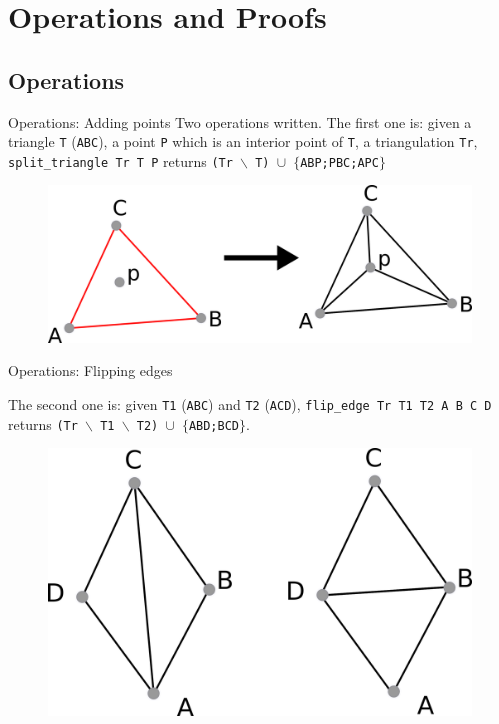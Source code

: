 \documentclass[18pt]{beamer}
\begin{document}
\section{Operations and Proofs}
\subsection{Operations}
\begin{frame}{Operations: Adding points}
Two operations written. The first one is: given a triangle {\tt T} ({\tt ABC}), a point {\tt P} which is an interior point of {\tt T}, a triangulation {\tt Tr}, {\tt split\_triangle Tr T P}
returns {\tt (Tr $\smallsetminus$ T) $\cup$ $\{$ABP;PBC;APC$\}$}

\begin{figure} 
  \centering
  \includegraphics[scale=1.2]{split_triangle}
\end{figure}
  \end{frame}
 

  \begin{frame}{Operations: Flipping edges}
  
   The second one is: given {\tt T1} ({\tt ABC}) and {\tt T2} ({\tt ACD}), {\tt flip\_edge Tr T1 T2 A B C D} returns {\tt (Tr $\smallsetminus$ T1 $\smallsetminus$ T2) $\cup$ $\{$ABD;BCD$\}$}.
   

 \begin{figure}
  \centering
  \includegraphics[scale=0.8]{flip_edge}

\end{figure}

\end{frame}
\end{document}
